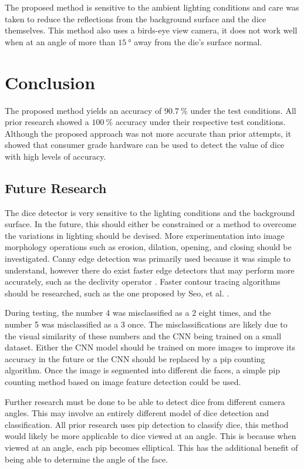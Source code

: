 \documentclass[conference]{IEEEtran}
\begin{document}
The proposed method is sensitive to the ambient lighting conditions and care was taken to reduce the reflections from the background surface and the dice themselves.
This method also uses a birds-eye view camera, it does not work well when at an angle of more than $\SI{15}{\degree}$ away from the die's surface normal.

\section{Conclusion}

The proposed method yields an accuracy of $\SI{90.7}{\percent}$ under the test conditions.
All prior research showed a $\SI{100}{\percent}$ accuracy under their respective test conditions.
Although the proposed approach was not more accurate than prior attempts, it showed that consumer grade hardware can be used to detect the value of dice with high levels of accuracy.

\subsection{Future Research}

The dice detector is very sensitive to the lighting conditions and the background surface.
In the future, this should either be constrained or a method to overcome the variations in lighting should be devised.
More experimentation into image morphology operations such as erosion, dilation, opening, and closing \cite{Szeliski2011} should be investigated.
Canny edge detection was primarily used because it was simple to understand, however there do exist faster edge detectors that may perform more accurately, such as the declivity operator \cite{Mich1995}\cite{Bhardwaj2012}.
Faster contour tracing algorithms should be researched, such as the one proposed by Seo, et al. \cite{Seo2016}.

During testing, the number 4 was misclassified as a 2 eight times, and the number 5 was misclassified as a 3 once.
The misclassifications are likely due to the visual similarity of these numbers and the CNN being trained on a small dataset. 
Either the CNN model should be trained on more images to improve its accuracy in the future or the CNN should be replaced by a pip counting algorithm.
Once the image is segmented into different die faces, a simple pip counting method based on image feature detection could be used.

Further research must be done to be able to detect dice from different camera angles.
This may involve an entirely different model of dice detection and classification.
All prior research uses pip detection to classify dice, this method would likely be more applicable to dice viewed at an angle.
This is because when viewed at an angle, each pip becomes elliptical.
This has the additional benefit of being able to determine the angle of the face.

\printbibliography
\end{document}
